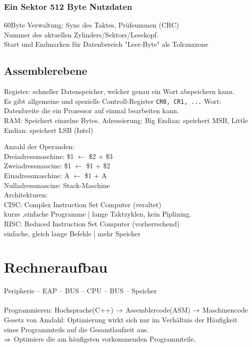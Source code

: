 \documentclass[fs]{latex4ei}
\begin{document}
\begin{multicols}{4}
	\subsubsection{Ein Sektor 512 Byte Nutzdaten}
	60Byte Verwaltung: Sync des Taktes, Prüfsummen (CRC)\\
	Nummer des aktuellen Zylinders/Sektors/Lesekopf.\\
	Start und Endmarken für Datenbereich
	"Leer-Byte" als Tolranzzone



	\subsection{Assemblerebene}
	Register: schneller Datenspeicher, welcher genau ein Wort abspeichern kann.\\
	Es gibt allgemeine und spezielle Controll-Register \texttt{CR0, CR1, ...}
	Wort: Datenbreite die ein Prozessor auf einmal bearbeiten kann.\\
	RAM: Speichert einzelne Bytes.
	Adressierung: Big Endian: speichert MSB, Little Endian: speichert LSB (Intel)


	Anzahl der Operanden:\\
	Dreiadressmaschine:  \$1 $\leftarrow$ \$2 + \$3\\
	Zweiadressmascine: \$1 $\leftarrow$ \$1 + \$2\\
	Einadressmaschine: A $\leftarrow$ \$1 + A\\
	Nulladressmascine: Stack-Maschine\\

	Architekturen:\\
	CISC: Complex Instruction Set Computer (veraltet)\\
		kurze ,einfache Programme | lange Taktzyklen, kein Piplining.\\
	RISC: Reduced Instruction Set Computer (vorherrschend)\\
		einfache, gleich lange Befehle | mehr Speicher
	

	\section{Rechneraufbau}
	Peripherie -- EAP -- BUS -- CPU -- BUS -- Speicher\\
	\\
	Programmieren: Hochsprache(C++) $\rightarrow$ Assemblercode(ASM) $\rightarrow$ Maschinencode\\
	Gesetz von Amdahl: Optimierung wirkt sich nur im Verhältnis der Häufigkeit eines Programmteils auf die Gesamtlaufzeit aus.\\
	$\Rightarrow$ Optimiere die am häufigsten vorkommenden Programmteile.
	




\end{multicols}
\end{document}
